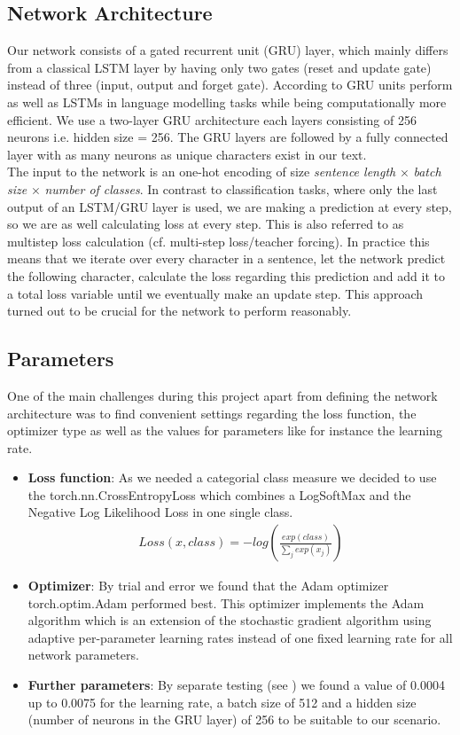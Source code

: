 \documentclass[11pt,a4paper,bibliography=totocnumbered,listof=totocnumbered]{scrartcl}
\begin{document}
\subsection{Network Architecture} \label{ssec:na}
Our network consists of a gated recurrent unit (GRU) layer, which mainly differs from a classical LSTM layer by having only two gates (reset and update gate) instead of three (input, output and forget gate). According to GRU units perform as well as LSTMs in language modelling tasks while being computationally more efficient. We use a two-layer GRU architecture each layers consisting of 256 neurons i.e. hidden size = 256. The GRU layers are followed by a fully connected layer with as many neurons as unique characters exist in our text. \\
The input to the network is an one-hot encoding of size \textit{sentence length} $\times$ \textit{batch size} $\times$ \textit{number of classes}. In contrast to classification tasks, where only the last output of an LSTM/GRU layer is used, we are making a prediction at every step, so we are as well calculating loss at every step. This is also referred to as multistep loss calculation (cf. multi-step loss/teacher forcing). In practice this means that we iterate over every character in a sentence, let the network predict the following character, calculate the loss regarding this prediction and add it to a total loss variable until we eventually make an update step. This approach turned out to be crucial for the network to perform reasonably.

\subsection{Parameters}
One of the main challenges during this project apart from defining the network architecture was to find convenient settings regarding the loss function, the optimizer type as well as the values for parameters like for instance the learning rate.  
\begin{itemize}
	\item \textbf{Loss function}: As we needed a categorial class measure we decided to use the torch.nn.CrossEntropyLoss which combines a LogSoftMax and the Negative Log Likelihood Loss in one single class. 
	\begin{align*}
		Loss(x, class) = -log \left( \frac{exp(class)}{\sum_j exp(x_j)} \right)
	\end{align*}	 

	\item \textbf{Optimizer}: By trial and error we found that the Adam optimizer torch.optim.Adam performed best. This optimizer implements the Adam algorithm which is an extension of the stochastic gradient algorithm using adaptive per-parameter learning rates instead of one fixed learning rate for all network parameters. 
	
	\item \textbf{Further parameters}: By separate testing (see ) we found a value of 0.0004 up to 0.0075 for the learning rate, a batch size of 512 and a hidden size (number of neurons in the GRU layer) of 256 to be suitable to our scenario. 
\end{itemize}
\end{document}
